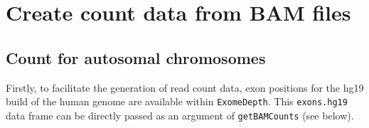 \documentclass[10pt]{article}
\begin{document}
\section{Create count data from BAM files}


\subsection{Count for autosomal chromosomes}
Firstly, to facilitate the generation of read count data,  exon positions for the hg19 build of the human genome are available within \texttt{ExomeDepth}.
This \texttt{exons.hg19} data frame can be directly passed as an argument of \texttt{getBAMCounts} (see below).
\end{document}
